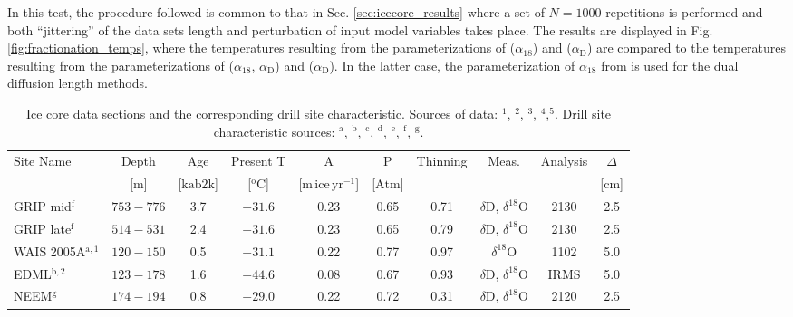 \documentclass[11pt, draftcls, onecolumn]{IEEEtran} %
\numberwithin{equation}{section}
\numberwithin{table}{section}
\numberwithin{figure}{section}
\begin{document}
In this test, the procedure followed is common to that in Sec. \ref{sec:icecore_results} where a set of $N = 1000$ repetitions is performed
and both ``jittering'' of the data sets length and perturbation of input model variables takes place.
The results are displayed in Fig. \ref{fig:fractionation_temps}, where the temperatures resulting from the parameterizations of
\cite{Majoube1971} ($\alpha_{18}$) and \cite{Merlivat1967} ($\alpha_\mathrm{D}$) are compared to the temperatures resulting from the parameterizations 
of \cite{Ellehoj2013} ($\alpha_{18}$, $\alpha_\mathrm{D}$) and \cite{Lamb2015} ($\alpha_\mathrm{D}$).
In the latter case, the parameterization of $\alpha_{18}$ from \cite{Majoube1971} is used for the dual diffusion length methods.

\begin{table}
	\center
	\caption{Ice core data sections and the corresponding drill site characteristic. Sources of data: \citep{Steig2013}$^\mathrm{1}$, 
		\citep{Oerter2004}$^\mathrm{2}$, \citep{Svensson2015}$^\mathrm{3}$, \citep{Gkinis2011b}$^\mathrm{4}$,\citep{Gkinis2011}$^\mathrm{5}$. Drill site characteristic sources:		
		\citep{Bantaetal2008}$^\mathrm{a}$, \citep{Oerter2004,Veres2013}$^\mathrm{b}$, \citep{Watanabeetal2003,Kawamuraetal2003}$^\mathrm{c}$,
		\citep{Lorius1979}$^\mathrm{d}$, \citep{NGRIPmembers2004,Gkinis2014}$^\mathrm{e}$, \citep{Johnsen2000}$^\mathrm{f}$, \citep{Guillevic2013,Rasmussen2013}$^\mathrm{g}$.
	}\label{tbl:drill_sites}
	\begin{tabular}{l c c c c c c c c c} 
		\toprule
		Site Name &Depth & Age  & Present T  &
		A & P & Thinning& Meas. & Analysis&$\Delta$\\
		&[$\mathrm{m}$]&[$\mathrm{ka b2k}$]&[$^\mathrm{o}\mathrm{C}$]& [$\mathrm{m \, ice \, yr^{-1}}$]&
		[$\mathrm{Atm}$]& & &&[$\mathrm{cm}$]\\
		\midrule
		GRIP mid$^\mathrm{f}$&$753-776$ & 3.7 &$-31.6 $ & 0.23 & 0.65 & 0.71&$\delta$D, $\delta^{18}$O&2130&2.5\\
		GRIP late$^\mathrm{f}$&$514-531$  &2.4 &$-31.6 $ &0.23 & 0.65  &  0.79&$\delta$D, $\delta^{18}$O&2130&2.5\\	
		WAIS 2005A$^\mathrm{a,1}$ &$120-150$  & 0.5 & $-31.1$ &0.22 & 0.77 & 0.97 &  	 $\delta^{18}$O&1102&5.0\\
		EDML$^\mathrm{b,2}$ & $123-178$&1.6&$-44.6$ & 0.08 & 0.67 & 0.93&$\delta$D, $\delta^{18}$O&IRMS&5.0\\		
		NEEM$^\mathrm{g}$&$174-194 $&0.8 &$-29.0$ & 0.22 &  0.72 &  0.31&$\delta$D, $\delta^{18}$O&2120&2.5\\       

\end{tabular}
\end{table}
\end{document}
